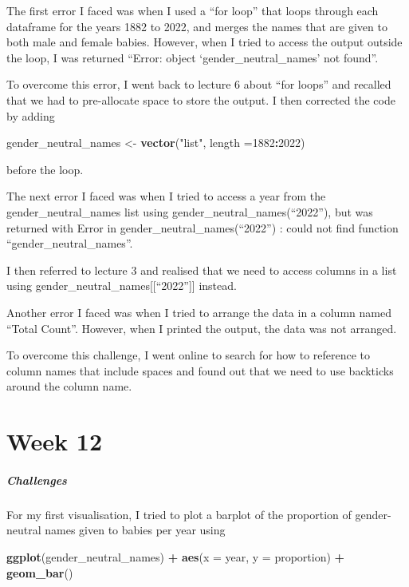 \documentclass[
]{article}
\newenvironment{Shaded}{\begin{snugshade}}{\end{snugshade}}
\newcommand{\AttributeTok}[1]{\textcolor[rgb]{0.13,0.29,0.53}{#1}}
\newcommand{\DecValTok}[1]{\textcolor[rgb]{0.00,0.00,0.81}{#1}}
\newcommand{\FunctionTok}[1]{\textcolor[rgb]{0.13,0.29,0.53}{\textbf{#1}}}
\newcommand{\NormalTok}[1]{#1}
\newcommand{\OtherTok}[1]{\textcolor[rgb]{0.56,0.35,0.01}{#1}}
\newcommand{\SpecialCharTok}[1]{\textcolor[rgb]{0.81,0.36,0.00}{\textbf{#1}}}
\newcommand{\StringTok}[1]{\textcolor[rgb]{0.31,0.60,0.02}{#1}}
\begin{document}
The first error I faced was when I used a ``for loop'' that loops
through each dataframe for the years 1882 to 2022, and merges the names
that are given to both male and female babies. However, when I tried to
access the output outside the loop, I was returned ``Error: object
`gender\_neutral\_names' not found''.

To overcome this error, I went back to lecture 6 about ``for loops'' and
recalled that we had to pre-allocate space to store the output. I then
corrected the code by adding

\begin{Shaded}
\begin{Highlighting}[]
\NormalTok{gender\_neutral\_names }\OtherTok{\textless{}{-}} \FunctionTok{vector}\NormalTok{(}\StringTok{"list"}\NormalTok{, }\AttributeTok{length =}\DecValTok{1882}\SpecialCharTok{:}\DecValTok{2022}\NormalTok{)}
\end{Highlighting}
\end{Shaded}

before the loop.

The next error I faced was when I tried to access a year from the
gender\_neutral\_names list using gender\_neutral\_names(``2022''), but
was returned with Error in gender\_neutral\_names(``2022'') : could not
find function ``gender\_neutral\_names''.

I then referred to lecture 3 and realised that we need to access columns
in a list using gender\_neutral\_names{[}{[}``2022''{]}{]} instead.

Another error I faced was when I tried to arrange the data in a column
named ``Total Count''. However, when I printed the output, the data was
not arranged.

To overcome this challenge, I went online to search for how to reference
to column names that include spaces and found out that we need to use
backticks around the column name.

\hypertarget{week-12}{%
\section{Week 12}\label{week-12}}

\hypertarget{challenges}{%
\subparagraph{\texorpdfstring{\textbf{Challenges}}{Challenges}}\label{challenges}}

For my first visualisation, I tried to plot a barplot of the proportion
of gender-neutral names given to babies per year using

\begin{Shaded}
\begin{Highlighting}[]
\FunctionTok{ggplot}\NormalTok{(gender\_neutral\_names) }\SpecialCharTok{+}
      \FunctionTok{aes}\NormalTok{(}\AttributeTok{x =}\NormalTok{ year, }\AttributeTok{y =}\NormalTok{ proportion) }\SpecialCharTok{+}
      \FunctionTok{geom\_bar}\NormalTok{() }
\end{Highlighting}
\end{Shaded}
\end{document}
